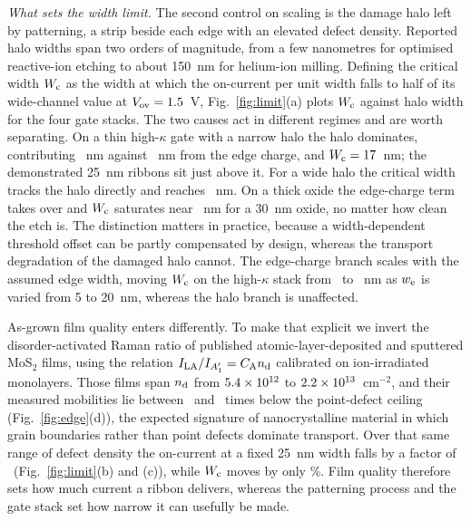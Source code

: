 \documentclass[aip,apl,amsmath,amssymb,reprint,longbibliography]{revtex4-1}
\begin{document}
\emph{What sets the width limit.} The second control on scaling is the damage
halo left by patterning, a strip beside each edge with an elevated defect
density. Reported halo widths span two orders of magnitude, from a few
nanometres for optimised reactive-ion etching\cite{Pena2026} to about 150~nm
for helium-ion milling.\cite{LiuHIM2025} Defining the critical width
$W_{\rm c}$ as the width at which the on-current per unit width falls to half
of its wide-channel value at $V_{\rm ov}=1.5$~V,
Fig.~\ref{fig:limit}(a) plots $W_{\rm c}$ against halo width for the four gate
stacks. The two causes act in different regimes and are worth separating. On a
thin high-$\kappa$ gate with a narrow halo the halo dominates, contributing
\WcHaloHfO~nm against \WcChgHfO~nm from the edge charge, and
$W_{\rm c}=17$~nm; the demonstrated 25~nm ribbons sit just above it. For a
wide halo the critical width tracks the halo directly and reaches
\WcHIM~nm. On a thick oxide the edge-charge term takes over and $W_{\rm c}$
saturates near \WcChgSiOThirty~nm for a 30~nm oxide, no matter how clean the
etch is. The distinction matters in practice, because a width-dependent
threshold offset can be partly compensated by design, whereas the transport
degradation of the damaged halo cannot. The edge-charge branch scales with the
assumed edge width, moving $W_{\rm c}$ on the high-$\kappa$ stack from
\WcHfOwFive\ to \WcHfOwTwenty~nm as $w_{\rm e}$ is varied from 5 to 20~nm,
whereas the halo branch is unaffected.

As-grown film quality enters differently. To make that explicit we invert the
disorder-activated Raman ratio of published atomic-layer-deposited and
sputtered MoS$_2$ films,\cite{Nattoo2025} using the relation
$I_{\rm LA}/I_{A_1'}=C_{\rm A}n_{\rm d}$ calibrated on ion-irradiated
monolayers.\cite{Mignuzzi2015} Those films span $n_{\rm d}$ from $5.4\times 10^{12}$ to
$2.2\times 10^{13}$~cm$^{-2}$, and their measured mobilities lie between \DeficitLo\ and
\DeficitHi\ times below the point-defect ceiling (Fig.~\ref{fig:edge}(d)), the
expected signature of nanocrystalline material in which grain boundaries rather
than point defects dominate transport.\cite{vanderZande2013} Over that same
range of defect density the on-current at a fixed 25~nm width falls by a factor
of \IdropFilm\ (Fig.~\ref{fig:limit}(b) and (c)), while $W_{\rm c}$ moves by
only \WcDriftFilm\%. Film quality therefore sets how much current a
ribbon delivers, whereas the patterning process and the gate stack set how
narrow it can usefully be made.
\end{document}

